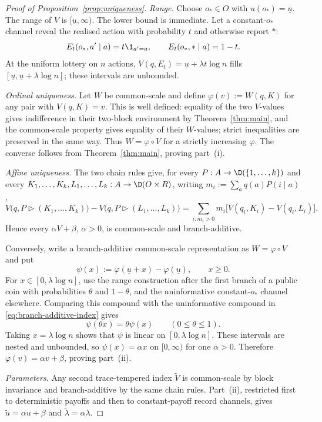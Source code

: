 \begin{proof}[Proof of Proposition~\ref{prop:uniqueness}]
\emph{Range.}
Choose $o_*\in O$ with $u(o_*)=\underline u$.  The range of $V$ is
$[\underline u,\infty)$.  The lower bound is immediate.  Let a constant-$o_*$
channel reveal the realised action with probability $t$ and otherwise report $*$:
\[
 E_t(o_*,a'\mid a)=t\1_{a'=a},
 \qquad
 E_t(o_*,*\mid a)=1-t.
\]
At the uniform lottery on $n$ actions,
$V(q,E_t)=\underline u+\lambda t\log n$ fills
$[\underline u,\underline u+\lambda\log n]$; these intervals are unbounded.

\emph{Ordinal uniqueness.}
Let $W$ be common-scale and define
$\varphi(v):=W(q,K)$ for any pair with $V(q,K)=v$.  This is well defined: equality of the two $V$-values gives
indifference in their two-block environment by Theorem~\ref{thm:main}, and the common-scale property gives equality
of their $W$-values; strict inequalities are preserved in the same way.  Thus
$W=\varphi\circ V$ for a strictly increasing $\varphi$.  The converse follows from
Theorem~\ref{thm:main}, proving part~\textup{(i)}.

\emph{Affine uniqueness.}
The two chain rules give, for every
$P:A\to\D(\{1,\ldots,k\})$ and every
$K_1,\ldots,K_k,L_1,\ldots,L_k:A\to\D(O\times R)$, writing
$m_i:=\sum_aq(a)P(i\mid a)$,
\[
 V\bigl(q,P\triangleright(K_1,\ldots,K_k)\bigr)
 -V\bigl(q,P\triangleright(L_1,\ldots,L_k)\bigr)
 =\sum_{i:m_i>0}m_i
 \bigl[V(q_i,K_i)-V(q_i,L_i)\bigr].
\]
Hence every $\alpha V+\beta$, $\alpha>0$, is common-scale and branch-additive.

Conversely, write a branch-additive common-scale representation as
$W=\varphi\circ V$ and put
\[
 \psi(x):=\varphi(\underline u+x)-\varphi(\underline u),
 \qquad x\ge0.
\]
For $x\in[0,\lambda\log n]$, use the range construction after the first
branch of a public coin with probabilities $\theta$ and $1-\theta$, and the
uninformative constant-$o_*$ channel elsewhere.  Comparing this compound with
the uninformative compound in \eqref{eq:branch-additive-index} gives
\[
 \psi(\theta x)=\theta\psi(x)
 \qquad(0\le\theta\le1).
\]
Taking $x=\lambda\log n$ shows that $\psi$ is linear on $[0,\lambda\log n]$.  These intervals are nested and
unbounded, so $\psi(x)=\alpha x$ on $[0,\infty)$ for one $\alpha>0$.  Therefore
$\varphi(v)=\alpha v+\beta$, proving part~\textup{(ii)}.

\emph{Parameters.}
Any second trace-tempered index $\widetilde V$ is common-scale by block
invariance and branch-additive by the same chain rules.  Part~\textup{(ii)},
restricted first to deterministic payoffs and then to constant-payoff record channels, gives
$\widetilde u=\alpha u+\beta$ and $\widetilde\lambda=\alpha\lambda$.
\end{proof}

